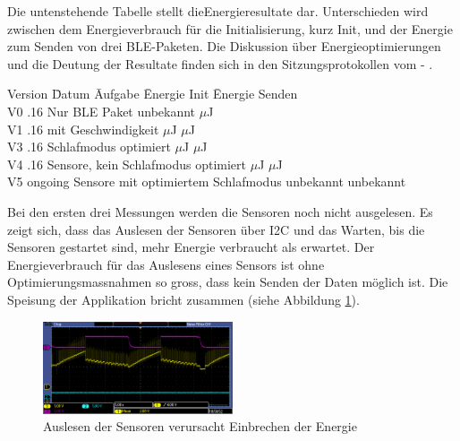 Die untenstehende Tabelle stellt dieEnergieresultate dar. Unterschieden wird zwischen dem Energieverbrauch für die Initialisierung, kurz Init, und der Energie zum Senden von drei BLE-Paketen. Die Diskussion über Energieoptimierungen und die Deutung der Resultate finden sich in den Sitzungsprotokollen vom \cite{sitzungsprotokoll_160226} - \cite{sitzungsprotokoll_160516_ms3}.

\begin{minipage}{\textwidth}
\begin{tabbing}
    Version   \quad\= Datum    \quad\= Aufgabe\hphantom{re, kein Schlafmodus optimiert} \quad\= Energie Init    \quad\=  Energie Senden \\[0.8ex]
    V0        .16  \> Nur BLE Paket      \> unbekannt             $\mu$J \\
    V1        .16  \> mit Geschwindigkeit       $\mu$J             $\mu$J \\
    V3        .16   \> Schlafmodus optimiert      $\mu$J             $\mu$J \\
    V4        .16     Sensore, kein Schlafmodus optimiert      $\mu$J             $\mu$J \\
    V5        \> ongoing     Sensore mit optimiertem Schlafmodus     \> unbekannt           \> unbekannt\\
\end{tabbing}
\end{minipage}

Bei den ersten drei Messungen werden die Sensoren noch nicht ausgelesen. Es zeigt sich, dass das Auslesen der Sensoren über I2C und das Warten, bis die Sensoren gestartet sind,  mehr Energie verbraucht als erwartet. Der Energieverbrauch für das Auslesens eines Sensors ist ohne Optimierungsmassnahmen so gross, dass kein Senden der Daten möglich ist. Die Speisung der Applikation bricht zusammen (siehe Abbildung \ref{i2c_problem}).

\begin{figure}[ht]
    \includegraphics[width=0.5\textwidth]{3Vorgehen/imag/pic4VSUPbrichtEin.PNG} 
    \caption{Auslesen der Sensoren verursacht Einbrechen der Energie}
    \label{i2c_problem}
\end{figure}

